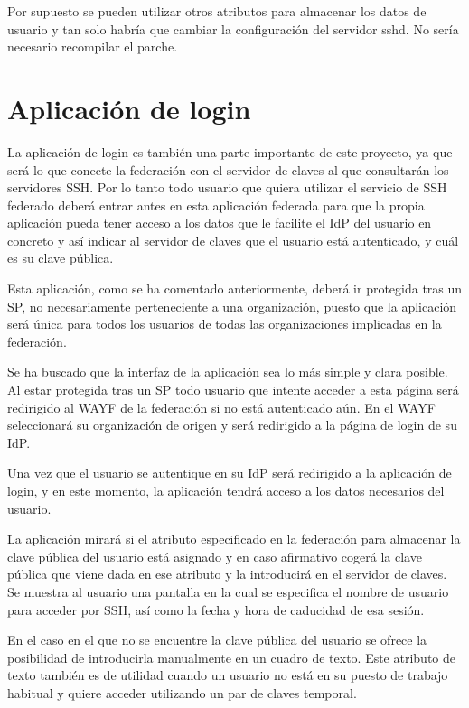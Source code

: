     Por supuesto se pueden utilizar otros atributos para almacenar los
    datos de usuario y tan solo habría que cambiar la configuración del
    servidor sshd. No sería necesario recompilar el parche.

    \section{Aplicación de login}
    \label{login}
    

    La aplicación de login es también una parte importante de este
    proyecto, ya que será lo que conecte la federación con el servidor de
    claves al que consultarán los servidores SSH. Por lo tanto todo usuario
    que quiera utilizar el servicio de SSH federado deberá entrar antes en
    esta aplicación federada para que la propia aplicación pueda tener
    acceso a los datos que le facilite el IdP del usuario en concreto y
    así indicar al servidor de claves que el usuario está autenticado, y
    cuál es su clave pública.

    Esta aplicación, como se ha comentado anteriormente, deberá ir
    protegida tras un SP, no necesariamente perteneciente a una
    organización, puesto que la aplicación será única para todos los
    usuarios de todas las organizaciones implicadas en la federación.

    Se ha buscado que la interfaz de la aplicación sea lo más simple y
    clara posible. Al estar protegida tras un SP todo usuario que
    intente acceder a esta página será redirigido al WAYF de la federación
    si no está autenticado aún. En el WAYF seleccionará su organización de
    origen y será redirigido a la página de login de su IdP.

    Una vez que el usuario se autentique en su IdP será redirigido a la
    aplicación de login, y en este momento, la aplicación tendrá acceso a
    los datos necesarios del usuario.

    La aplicación mirará si el atributo especificado en la federación para
    almacenar la clave pública del usuario está asignado y en caso
    afirmativo cogerá la clave pública que viene dada en ese atributo y la
    introducirá en el servidor de claves. Se muestra al usuario una
    pantalla en la cual se especifica el nombre de usuario para acceder por
    SSH, así como la fecha y hora de caducidad de esa sesión.

    En el caso en el que no se encuentre la clave pública del usuario se
    ofrece la posibilidad de introducirla manualmente en un cuadro de
    texto. Este atributo de texto también es de utilidad cuando un usuario no
    está en su puesto de trabajo habitual y quiere acceder utilizando un
    par de claves temporal.

